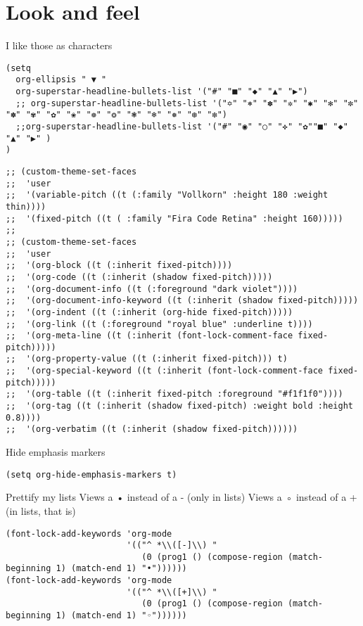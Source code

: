 \documentclass[11pt]{article}
\begin{document}
\section{Look and feel}
\label{sec:org46e6093}
I like those as characters
\begin{verbatim}
(setq
  org-ellipsis " ▼ "
  org-superstar-headline-bullets-list '("#" "■" "◆" "▲" "▶")
  ;; org-superstar-headline-bullets-list '("✡" "⎈" "✽" "✲" "✱" "✻" "✼" "✽" "✾" "✿" "❀" "❁" "❂" "❃" "❄" "❅" "❆" "❇")
  ;;org-superstar-headline-bullets-list '("#" "◉" "○" "✜" "✿""■" "◆" "▲" "▶" )
)
\end{verbatim}
\begin{verbatim}
;; (custom-theme-set-faces
;;  'user
;;  '(variable-pitch ((t (:family "Vollkorn" :height 180 :weight thin))))
;;  '(fixed-pitch ((t ( :family "Fira Code Retina" :height 160)))))
;;
;; (custom-theme-set-faces
;;  'user
;;  '(org-block ((t (:inherit fixed-pitch))))
;;  '(org-code ((t (:inherit (shadow fixed-pitch)))))
;;  '(org-document-info ((t (:foreground "dark violet"))))
;;  '(org-document-info-keyword ((t (:inherit (shadow fixed-pitch)))))
;;  '(org-indent ((t (:inherit (org-hide fixed-pitch)))))
;;  '(org-link ((t (:foreground "royal blue" :underline t))))
;;  '(org-meta-line ((t (:inherit (font-lock-comment-face fixed-pitch)))))
;;  '(org-property-value ((t (:inherit fixed-pitch))) t)
;;  '(org-special-keyword ((t (:inherit (font-lock-comment-face fixed-pitch)))))
;;  '(org-table ((t (:inherit fixed-pitch :foreground "#f1f1f0"))))
;;  '(org-tag ((t (:inherit (shadow fixed-pitch) :weight bold :height 0.8))))
;;  '(org-verbatim ((t (:inherit (shadow fixed-pitch))))))

\end{verbatim}
Hide emphasis markers
\begin{verbatim}
(setq org-hide-emphasis-markers t)
\end{verbatim}
Prettify my lists
Views a • instead of a - (only in lists)
Views a ◦ instead of a + (in lists, that is)
\begin{verbatim}
(font-lock-add-keywords 'org-mode
                        '(("^ *\\([-]\\) "
                           (0 (prog1 () (compose-region (match-beginning 1) (match-end 1) "•"))))))
(font-lock-add-keywords 'org-mode
                        '(("^ *\\([+]\\) "
                           (0 (prog1 () (compose-region (match-beginning 1) (match-end 1) "◦"))))))
\end{verbatim}
\end{document}
